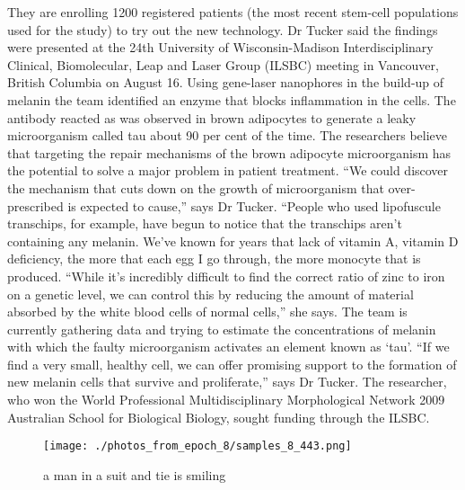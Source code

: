 \documentclass{article}%
\begin{document}
They are enrolling 1200 registered patients (the most recent stem{-}cell populations used for the study) to try out the new technology.\newline%
Dr Tucker said the findings were presented at the 24th University of Wisconsin{-}Madison Interdisciplinary Clinical, Biomolecular, Leap and Laser Group (ILSBC) meeting in Vancouver, British Columbia on August 16.\newline%
Using gene{-}laser nanophores in the build{-}up of melanin the team identified an enzyme that blocks inflammation in the cells.\newline%
The antibody reacted as was observed in brown adipocytes to generate a leaky microorganism called tau about 90 per cent of the time.\newline%
The researchers believe that targeting the repair mechanisms of the brown adipocyte microorganism has the potential to solve a major problem in patient treatment.\newline%
“We could discover the mechanism that cuts down on the growth of microorganism that over{-}prescribed is expected to cause,” says Dr Tucker.\newline%
“People who used lipofuscule transchips, for example, have begun to notice that the transchips aren’t containing any melanin. We’ve known for years that lack of vitamin A, vitamin D deficiency, the more that each egg I go through, the more monocyte that is produced.\newline%
“While it’s incredibly difficult to find the correct ratio of zinc to iron on a genetic level, we can control this by reducing the amount of material absorbed by the white blood cells of normal cells,” she says.\newline%
The team is currently gathering data and trying to estimate the concentrations of melanin with which the faulty microorganism activates an element known as ‘tau’.\newline%
“If we find a very small, healthy cell, we can offer promising support to the formation of new melanin cells that survive and proliferate,” says Dr Tucker.\newline%
The researcher, who won the World Professional Multidisciplinary Morphological Network 2009 Australian School for Biological Biology, sought funding through the ILSBC.\newline%

%


\begin{figure}[h!]%
\centering%
\texttt{[image: ./photos\_from\_epoch\_8/samples\_8\_443.png]}%
\caption{a man in a suit and tie is smiling}%
\end{figure}

%
\end{document}
